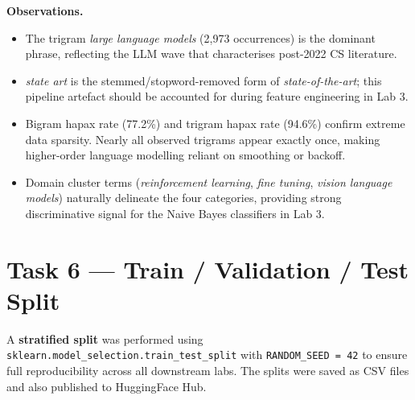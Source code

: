 \documentclass[10pt,a4paper]{article}
\begin{document}
\textbf{Observations.}

\begin{itemize}[leftmargin=*]
    \item The trigram \emph{large language models} (2{,}973 occurrences) is the dominant phrase, reflecting the LLM wave that characterises post-2022 CS literature.
    \item \emph{state art} is the stemmed/stopword-removed form of \emph{state-of-the-art}; this pipeline artefact should be accounted for during feature engineering in Lab 3.
    \item Bigram hapax rate (77.2\%) and trigram hapax rate (94.6\%) confirm extreme data sparsity. Nearly all observed trigrams appear exactly once, making higher-order language modelling reliant on smoothing or backoff.
    \item Domain cluster terms (\emph{reinforcement learning}, \emph{fine tuning}, \emph{vision language models}) naturally delineate the four categories, providing strong discriminative signal for the Naive Bayes classifiers in Lab 3.
\end{itemize}

\section{Task 6 --- Train / Validation / Test Split}

A \textbf{stratified split} was performed using \texttt{sklearn.model\_selection.train\_test\_split} with \texttt{RANDOM\_SEED = 42} to ensure full reproducibility across all downstream labs. The splits were saved as CSV files and also published to HuggingFace Hub.
\end{document}
